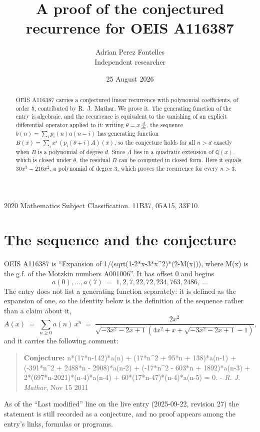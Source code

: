 \documentclass[11pt,a4paper]{article}
\title{A proof of the conjectured recurrence for OEIS A116387}
\author{Adrian Perez Fontelles\\ \small Independent researcher}
\date{25 August 2026}
\theoremstyle{plain}
\theoremstyle{definition}
\begin{document}
\maketitle

\begin{abstract}
OEIS A116387 carries a conjectured linear recurrence with polynomial coefficients, of
order 5, contributed by R.~J.~Mathar. We prove it. The generating function of the
entry is algebraic, and the recurrence is equivalent to the vanishing of an explicit
differential operator applied to it: writing $\theta=x\,\frac{d}{dx}$, the sequence
$b(n)=\sum_{i}p_{i}(n)a(n-i)$ has generating function
$B(x)=\sum_{i}x^{i}\,(p_{i}(\theta+i)A)(x)$, so the conjecture holds for all $n>d$ exactly
when $B$ is a polynomial of degree $d$. Since $A$ lies in a quadratic extension of
$\mathbb{Q}(x)$, which is closed under $\theta$, the residual $B$ can be computed in
closed form. Here it equals $30 x^{3} - 216 x^{2}$, a polynomial of degree $3$, which proves
the recurrence for every $n>3$.
\end{abstract}

\noindent\small 2020 Mathematics Subject Classification. 11B37, 05A15, 33F10.\normalsize

\section{The sequence and the conjecture}

OEIS A116387 is ``Expansion of 1/(sqrt(1-2*x-3*x\^{}2)*(2-M(x))), where M(x) is the g.f. of the Motzkin numbers A001006''. It has offset $0$ and begins
\[
a(0),\dots,a(7)\;=\;1, 2, 7, 22, 72, 234, 763, 2486,\ \dots
\]
The entry does not list a generating function separately: it is defined as the
expansion of one, so the identity below is the definition of the sequence rather than a
claim about it,
\begin{equation}\label{eq:gf}
A(x)\;=\;\sum_{n\ge 0} a(n)\,x^{n}\;=\;\frac{2 x^{2}}{\sqrt{- 3 x^{2} - 2 x + 1} \left(4 x^{2} + x + \sqrt{- 3 x^{2} - 2 x + 1} - 1\right)} ,
\end{equation}
and it carries the following comment:
\begin{quote}\small
\textbf{Conjecture:} n*(17*n-142)*a(n) + (17*n\^{}2 + 95*n + 138)*a(n-1) + (-391*n\^{}2 + 2488*n - 2908)*a(n-2) + (-17*n\^{}2 - 603*n + 1892)*a(n-3) + 2*(697*n-2021)*(n-4)*a(n-4) + 60*(17*n-47)*(n-4)*a(n-5) = 0. - \emph{R. J. Mathar}, Nov 15 2011
\end{quote}
As of the ``Last modified'' line on the live entry (2025-09-22, revision 27) the
statement is still recorded as a conjecture, and no proof appears among the entry's links,
formulas or programs.
\end{document}
